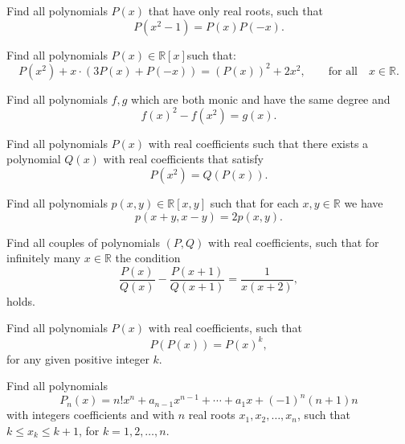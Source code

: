\begin{question}
Find all polynomials $P(x)$ that have only real roots, such that \[ P(x^2-1)=P(x)P(-x). \]
\end{question}





\begin{question}
Find all polynomials $P(x) \in \mathbb R[x]$such that:
\[P(x^2)+x \cdot (3P(x)+P(-x))=(P(x))^2+2x^2, \qquad \text{for all} \quad x\in  \mathbb R.\]
\end{question}





\begin{question}
Find all polynomials $f,g$ which are both monic and have the same degree and
\[f(x)^2-f(x^2)=g(x).\]
\end{question}





\begin{question}
Find all polynomials $P(x)$ with real coefficients such that there exists a polynomial $Q(x)$ with real coefficients that satisfy 
\[P(x^2)=Q(P(x)).\]
\end{question}





\begin{question}
Find all polynomials $p(x,y)\in\mathbb R[x,y]$ such that for each $x,y\in\mathbb R$ we have
\[ p(x+y,x-y)=2p(x,y). \]
\end{question}





\begin{question}
Find all couples of polynomials $(P,Q)$ with real coefficients, such that for infinitely many $x\in\mathbb R$ the condition \[ \frac{P(x)}{Q(x)}-\frac{P(x+1)}{Q(x+1)}=\frac{1}{x(x+2)},\]
holds.
\end{question}





\begin{question}
Find all polynomials $P(x)$ with real coefficients, such that \[P(P(x))=P(x)^k,\] for any given positive integer $k$.
\end{question}





\begin{question}
Find all polynomials 
\[P_{n}(x)=n!x^n + a_{n-1}x^{n-1}+\cdots+ a_{1}x +(-1)^n(n+1)n\]
with integers coefficients and with $n$ real roots $x_1, x_2, \dots, x_n$, such that $k\leq x_k\leq k+1$, for $k=1,2,\dots,n$.
\end{question}





